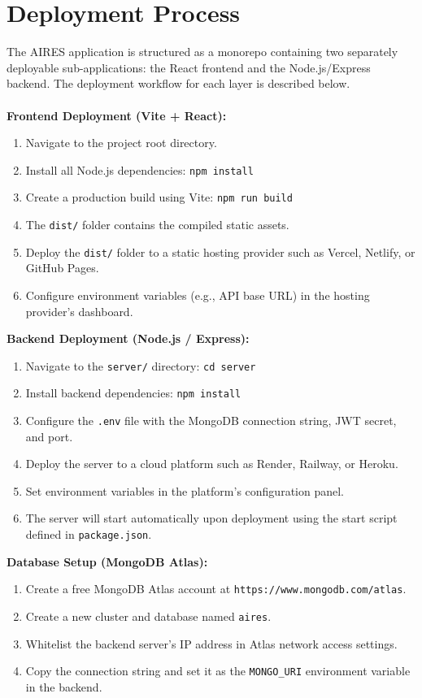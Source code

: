 \section{Deployment Process}
The AIRES application is structured as a monorepo containing two separately deployable sub-applications: the React frontend and the Node.js/Express backend. The deployment workflow for each layer is described below.\\\\
\textbf{Frontend Deployment (Vite + React):}
\begin{enumerate}
    \item Navigate to the project root directory.
    \item Install all Node.js dependencies: \texttt{npm install}
    \item Create a production build using Vite: \texttt{npm run build}
    \item The \texttt{dist/} folder contains the compiled static assets.
    \item Deploy the \texttt{dist/} folder to a static hosting provider such as Vercel, Netlify, or GitHub Pages.
    \item Configure environment variables (e.g., API base URL) in the hosting provider's dashboard.
\end{enumerate}
\textbf{Backend Deployment (Node.js / Express):}
\begin{enumerate}
    \item Navigate to the \texttt{server/} directory: \texttt{cd server}
    \item Install backend dependencies: \texttt{npm install}
    \item Configure the \texttt{.env} file with the MongoDB connection string, JWT secret, and port.
    \item Deploy the server to a cloud platform such as Render, Railway, or Heroku.
    \item Set environment variables in the platform's configuration panel.
    \item The server will start automatically upon deployment using the start script defined in \texttt{package.json}.
\end{enumerate}
\textbf{Database Setup (MongoDB Atlas):}
\begin{enumerate}
    \item Create a free MongoDB Atlas account at \texttt{https://www.mongodb.com/atlas}.
    \item Create a new cluster and database named \texttt{aires}.
    \item Whitelist the backend server's IP address in Atlas network access settings.
    \item Copy the connection string and set it as the \texttt{MONGO\_URI} environment variable in the backend.
\end{enumerate}

